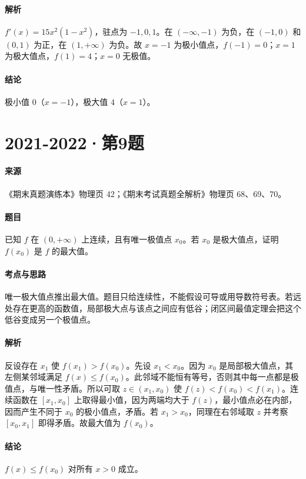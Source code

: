 \documentclass[UTF8,fontset=fandol,12pt,oneside,openany]{ctexrep}
\theoremstyle{definition}
\begin{document}
\paragraph{解析}
$f'(x)=15x^2(1-x^2)$，驻点为 $-1,0,1$。在 $(-\infty,-1)$ 为负，在 $(-1,0)$ 和 $(0,1)$ 为正，在 $(1,+\infty)$ 为负。故 $x=-1$ 为极小值点，$f(-1)=0$；$x=1$ 为极大值点，$f(1)=4$；$x=0$ 无极值。
\paragraph{结论}
极小值 $0$（$x=-1$），极大值 $4$（$x=1$）。

\par\addvspace{18pt}\noindent\begin{minipage}{\linewidth}
\section{2021-2022·第9题}
\paragraph{来源}《期末真题演练本》物理页 42；《期末考试真题全解析》物理页 68、69、70。
\paragraph{题目}
已知 $f$ 在 $(0,+\infty)$ 上连续，且有唯一极值点 $x_0$。若 $x_0$ 是极大值点，证明 $f(x_0)$ 是 $f$ 的最大值。
\end{minipage}\par
\paragraph{考点与思路}
唯一极大值点推出最大值。题目只给连续性，不能假设可导或用导数符号表。若远处存在更高的函数值，局部极大点与该点之间应有低谷；闭区间最值定理会把这个低谷变成另一个极值点。
\paragraph{解析}
反设存在 $x_1$ 使 $f(x_1)>f(x_0)$。先设 $x_1<x_0$。因为 $x_0$ 是局部极大值点，其左侧某邻域满足 $f(x)\le f(x_0)$。此邻域不能恒有等号，否则其中每一点都是极值点，与唯一性矛盾。所以可取 $z\in(x_1,x_0)$ 使 $f(z)<f(x_0)<f(x_1)$。连续函数在 $[x_1,x_0]$ 上取得最小值，因为两端均大于 $f(z)$，最小值点必在内部，因而产生不同于 $x_0$ 的极小值点，矛盾。若 $x_1>x_0$，同理在右邻域取 $z$ 并考察 $[x_0,x_1]$ 即得矛盾。故最大值为 $f(x_0)$。
\paragraph{结论}
$f(x)\le f(x_0)$ 对所有 $x>0$ 成立。
\end{document}
